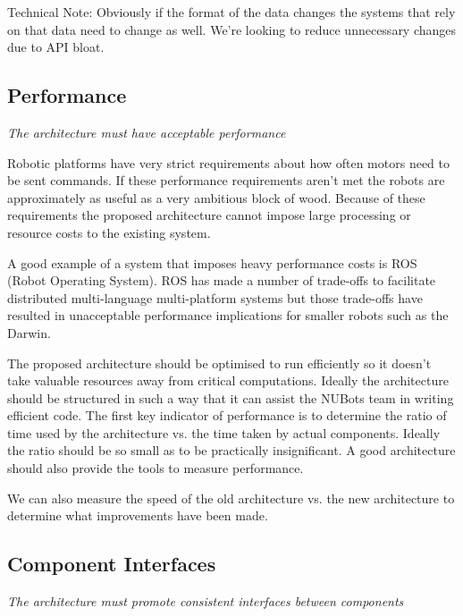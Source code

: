 \documentclass[english,12pt]{scrartcl}
\newcommand{\requirement}[1]{\textit{#1}}
\begin{document}
            Technical Note: Obviously if the format of the data changes the systems that rely on
            that data need to change as well. We're looking to reduce unnecessary changes due to API
            bloat.
            
        
        \subsection{Performance}
            \requirement{The architecture must have acceptable performance}
            
            Robotic platforms have very strict requirements about how often motors need to be sent
            commands. If these performance requirements aren't met the robots are approximately as
            useful as a very ambitious block of wood. Because of these requirements the proposed
            architecture cannot impose large processing or resource costs to the existing system.
            
            A good example of a system that imposes heavy performance costs is ROS (Robot Operating
            System). ROS has made a number of trade-offs to facilitate distributed multi-language
            multi-platform systems but those trade-offs have resulted in unacceptable performance
            implications for smaller robots such as the Darwin.
            
            The proposed architecture should be optimised to run efficiently so it doesn't take
            valuable resources away from critical computations. Ideally the architecture should be
            structured in such a way that it can assist the NUBots team in writing efficient code.
            The first key indicator of performance is to determine the ratio of time used by the
            architecture vs. the time taken by actual components. Ideally the ratio should be so
            small as to be practically insignificant. A good architecture should also provide the
            tools to measure performance.
            
            We can also measure the speed of the old architecture vs. the new architecture to
            determine what improvements have been made. 
        
        \subsection{Component Interfaces}
            \requirement{The architecture must promote consistent interfaces between components}
            
\end{document}
